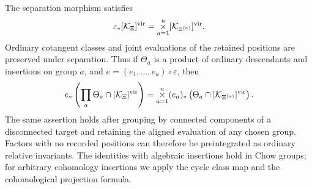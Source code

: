 \begin{proposition}
\label{ev:groups}
The separation morphism satisfies
\begin{equation}
\label{ev:group-vfc}
  \varepsilon_*[\mathcal K_\Xi]^{\mathrm{vir}}
  =\mathop{\times}_{a=1}^u[\mathcal K_{\Xi^{(a)}}]^{\mathrm{vir}}.
\end{equation}
Ordinary cotangent classes and joint evaluations of the retained
positions are preserved under separation.  Thus if $\Theta_a$
is a product of ordinary descendants and insertions on group $a$,
and $e=(e_1,\ldots,e_u)\circ\varepsilon$, then
\begin{equation}
\label{ev:group-correspondence}
 e_*\left(\prod_a\Theta_a\cap[\mathcal K_\Xi]^{\mathrm{vir}}\right)
 =\mathop{\times}_{a=1}^u
   (e_a)_*\left(\Theta_a\cap
           [\mathcal K_{\Xi^{(a)}}]^{\mathrm{vir}}\right).
\end{equation}
The same assertion holds after grouping by connected components
of a disconnected target and retaining the aligned evaluation of
any chosen group.  Factors with no recorded positions can therefore
be preintegrated as ordinary relative invariants.  The identities
with algebraic insertions hold in Chow groups; for arbitrary
cohomology insertions we apply the cycle class map and the
cohomological projection formula.
\end{proposition}

